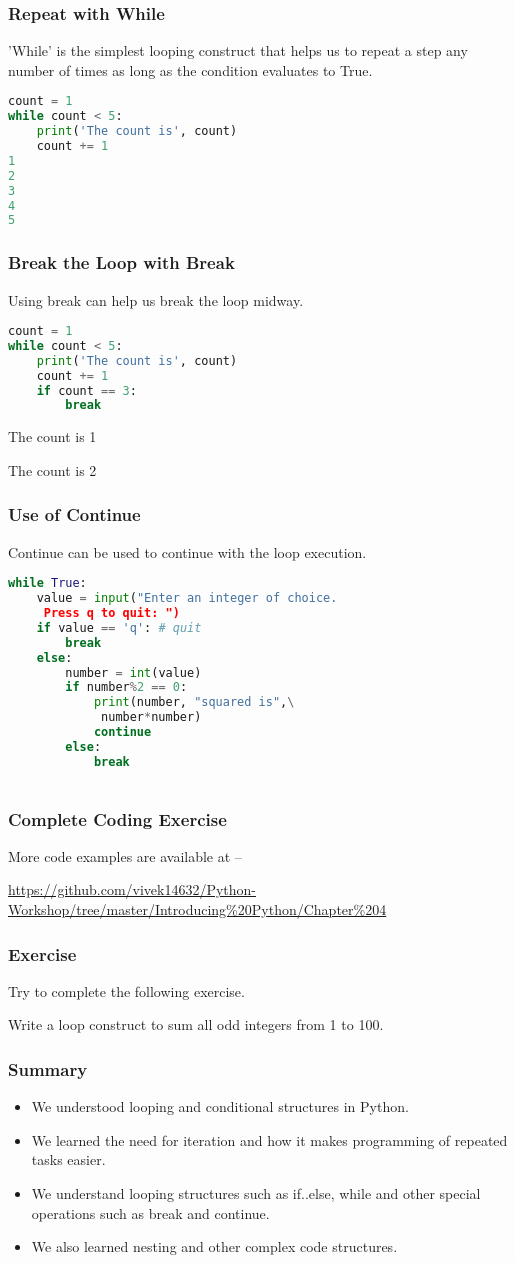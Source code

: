 \documentclass{beamer}
\begin{document}
\begin{frame}[fragile]
\frametitle{Repeat with While}
'While' is the simplest looping construct that helps us to repeat a step any number of times as long as the condition evaluates to True.
\begin{lstlisting}[language=Python]
count = 1
while count < 5:
    print('The count is', count)
    count += 1
1
2
3
4
5
\end{lstlisting}
\end{frame}

\begin{frame}[fragile]
\frametitle{Break the Loop with Break}
Using break can help us break the loop midway.
\begin{lstlisting}[language=Python]
count = 1
while count < 5:
    print('The count is', count)
    count += 1
    if count == 3:
    	break
\end{lstlisting}
The count is 1

The count is 2
\end{frame}

\begin{frame}[fragile]
\frametitle{Use of Continue}
Continue can be used to continue with the loop execution.
\begin{lstlisting}[language=Python]
while True:
    value = input("Enter an integer of choice.
     Press q to quit: ")
    if value == 'q': # quit
        break
    else:
        number = int(value)
        if number%2 == 0:
            print(number, "squared is",\
             number*number)
            continue
        else:
            break
        
\end{lstlisting}
\end{frame}

\begin{frame}
\frametitle{Complete Coding Exercise}
More code examples are available at --
 
\url{https://github.com/vivek14632/Python-Workshop/tree/master/Introducing\%20Python/Chapter\%204}
\end{frame}

\begin{frame}
\frametitle{Exercise}
Try to complete the following exercise.

Write a loop construct to sum all odd integers from 1 to 100.
\end{frame}

\begin{frame}
\frametitle{Summary}
\begin{itemize}
\item We understood looping and conditional structures in Python.
\item We learned the need for iteration and how it makes programming of repeated tasks easier.
\item We understand looping structures such as if..else, while and other special operations such as break and continue.
\item We also learned nesting and other complex code structures.
\end{itemize}
\end{frame}
\end{document}
